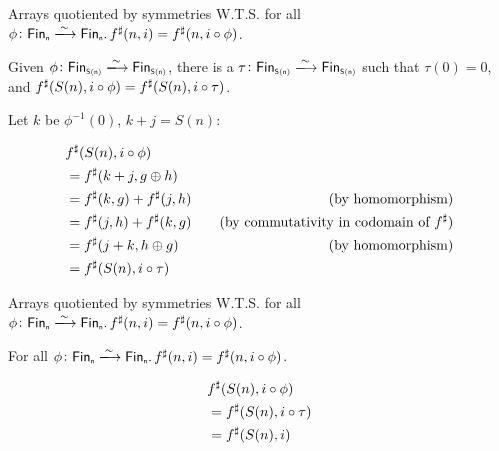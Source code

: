 \documentclass[9pt]{beamer}
\begin{document}
\begin{frame}[fragile]{Arrays quotiented by symmetries}
    W.T.S. for all $\phi\colon \Fin[n]\xto{\sim}\Fin[n]. \, \ext{f}(n, i) = \ext{f}(n, i \circ \phi)$.

    \begin{tblock}
    Given $\phi\colon \Fin[S(n)]\xto{\sim}\Fin[S(n)]$, there is a $\tau\colon \Fin[S(n)]\xto{\sim}\Fin[S(n)]$
    such that $\tau(0) = 0$, and ${f}^{\sharp}(S(n), i \circ \phi) = {f}^{\sharp}(S(n), i \circ \tau)$.

    Let $k$ be $\phi^{-1}(0)$, $k + j = S(n)$:
    
    \begin{align*}
        & {f}^{\sharp}(S(n), i \circ \phi) \\
        & = {f}^{\sharp}(k + j, g \oplus h) \\
        & = {f}^{\sharp}(k, g) + {f}^{\sharp}(j, h) & \quad \text{(by homomorphism)} \\
        & = {f}^{\sharp}(j, h) + {f}^{\sharp}(k, g) & \quad \text{(by commutativity in codomain of ${f}^{\sharp}$)}\\
        & = {f}^{\sharp}(j + k, h \oplus g)    & \quad \text{(by homomorphism)} \\
        & = {f}^{\sharp}(S(n), i \circ \tau)
    \end{align*}
    
    \end{tblock}
    
\end{frame}

\begin{frame}[fragile]{Arrays quotiented by symmetries}
    W.T.S. for all $\phi\colon \Fin[n]\xto{\sim}\Fin[n]. \, \ext{f}(n, i) = \ext{f}(n, i \circ \phi)$.

    \begin{tblock}
    For all $\phi\colon \Fin[n]\xto{\sim}\Fin[n]. \, \ext{f}(n, i) = \ext{f}(n, i \circ \phi)$.
    
    \begin{align*}
        & {f}^{\sharp}(S(n), i \circ \phi) \\
        & = {f}^{\sharp}(S(n), i \circ \tau) \\
        & = {f}^{\sharp}(S(n), i)
    \end{align*}
    
    \end{tblock}
    
\end{frame}
\end{document}
